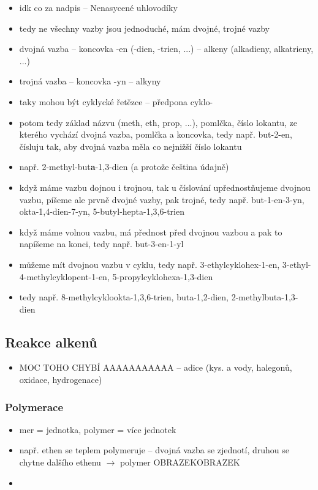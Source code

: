 \documentclass{article}
\begin{document}
\begin{itemize}
  \item idk co za nadpis -- Nenasycené uhlovodíky
  \item tedy ne všechny vazby jsou jednoduché, mám dvojné, trojné vazby
  \item dvojná vazba -- koncovka -en (-dien, -trien, ...) -- alkeny (alkadieny, alkatrieny, ...)
  \item trojná vazba -- koncovka -yn -- alkyny
  \item taky mohou být cyklycké řetězce -- předpona cyklo-
  \item potom tedy základ názvu (meth, eth, prop, ...), pomlčka, číslo lokantu, ze kterého vychází dvojná vazba, pomlčka a koncovka, tedy např. but-2-en, čísluju tak, aby dvojná vazba měla co nejnižší číslo lokantu
  \item např. 2-methyl-but\textbf{a}-1,3-dien (a protože čeština údajně)
  \item když máme vazbu dojnou i trojnou, tak u číslování upřednostňujeme dvojnou vazbu, píšeme ale prvně dvojné vazby, pak trojné, tedy např. but-1-en-3-yn, okta-1,4-dien-7-yn, 5-butyl-hepta-1,3,6-trien
  \item když máme volnou vazbu, má přednost před dvojnou vazbou a pak to napíšeme na konci, tedy např. but-3-en-1-yl
  \item můžeme mít dvojnou vazbu v cyklu, tedy např. 3-ethylcyklohex-1-en, 3-ethyl-4-methylcyklopent-1-en, 5-propylcyklohexa-1,3-dien
  \item tedy např. 8-methylcyklookta-1,3,6-trien, buta-1,2-dien, 2-methylbuta-1,3-dien
\end{itemize}

\subsection{Reakce alkenů}
\begin{itemize}
  \item MOC TOHO CHYBÍ AAAAAAAAAAA -- adice (kys. a vody, halegonů, oxidace, hydrogenace)
\end{itemize}

\subsubsection{Polymerace}
\begin{itemize}
  \item mer = jednotka, polymer = více jednotek
  \item např. ethen se teplem polymeruje -- dvojná vazba se zjednotí, druhou se chytne dalšího ethenu $\rightarrow$ polymer OBRAZEKOBRAZEK
  \item
\end{itemize}
\end{document}
